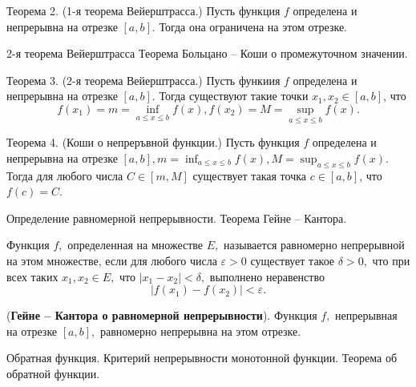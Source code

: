 Теорема 2. (1-я теорема Вейерштрасса.) Пусть функция $f$ определена и непрерывна на отрезке $[a, b]$. Тогда она ограничена на этом отрезке.

\newpage
\begin{problem}
2-я теорема Вейерштрасса Теорема Больцано – Коши о промежуточном значении.
\end{problem}
Теорема 3. (2-я теорема Вейерштрасса.) Пусть функиия $f$ определена и непрерывна на отрезке $[a, b]$. Тогда существуют такие точки $x_1, x_2 \in[a, b]$, что
$$
f\left(x_1\right)=m=\inf _{a \leq x \leq b} f(x), f\left(x_2\right)=M=\sup _{a \leq x \leq b} f(x) .
$$

Теорема 4. (Коши о непреръвной функции.) Пусть функция $f$ определена и непрерывна на отрезке $[a, b], m=\inf _{a \leq x \leq b} f(x), M=\sup _{a \leq x \leq b} f(x)$. Тогда для любого числа $C \in[m, M]$ существует такая точка $c \in[a, b]$, что $f(c)=C$.

\newpage
\begin{problem}
Определение равномерной непрерывности. Теорема Гейне – Кантора.
\end{problem}

\begin{definition}
    Функция $f,$ определенная на множестве $E,$
    называется равномерно непрерывной на этом множестве,
    если для любого числа $\varepsilon>0$ существует
    такое $\delta>0,$ что при всех таких
    $x_1, x_2\in E,$ что $|x_1-x_2|<\delta,$ выполнено
    неравенство
    $$
        |f(x_1)-f(x_2)|<\varepsilon.
    $$
\end{definition}

\begin{theorem}(\textbf{Гейне -- Кантора о равномерной
        непрерывности}).
    Функция $f,$ непрерывная на отрезке $[a, b],$
    равномерно непрерывна на этом отрезке.
\end{theorem}

\newpage
\begin{problem}
Обратная функция. Критерий непрерывности монотонной функции. Теорема об обратной функции.
\end{problem}

